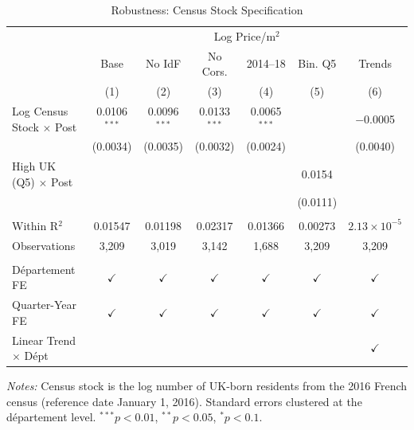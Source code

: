 
\begin{table}[htbp]
   \caption{\label{tab:robust} Robustness: Census Stock Specification}
   \bigskip
   \centering
   \begin{tabular}{lcccccc}
      \toprule
       & \multicolumn{6}{c}{Log Price/m$^2$}\\
                                             & Base           & No IdF         & No Cors.       & 2014--18       & Bin. Q5       & Trends \\
                                             & (1)            & (2)            & (3)            & (4)            & (5)           & (6)\\
      \midrule
      Log Census Stock $\times$ Post         & 0.0106$^{***}$ & 0.0096$^{***}$ & 0.0133$^{***}$ & 0.0065$^{***}$ &               & $-$0.0005\\
                                             & (0.0034)       & (0.0035)       & (0.0032)       & (0.0024)       &               & (0.0040)\\
      High UK (Q5) $\times$ Post             &                &                &                &                & 0.0154        &   \\
                                             &                &                &                &                & (0.0111)      &   \\
       \\
      Within R$^2$                           & 0.01547        & 0.01198        & 0.02317        & 0.01366        & 0.00273       & $2.13\times 10^{-5}$\\
      Observations                           & 3,209          & 3,019          & 3,142          & 1,688          & 3,209         & 3,209\\
       \\
      D\'{e}partement FE                     & $\checkmark$   & $\checkmark$   & $\checkmark$   & $\checkmark$   & $\checkmark$  & $\checkmark$\\
      Quarter-Year FE                        & $\checkmark$   & $\checkmark$   & $\checkmark$   & $\checkmark$   & $\checkmark$  & $\checkmark$\\
      Linear Trend $\times$ D\'{e}pt         &                &                &                &                &               & $\checkmark$\\
      \bottomrule
   \end{tabular}
   \par\vspace{0.5em}\noindent\footnotesize{\textit{Notes:} Census stock is the log number of UK-born residents from the 2016 French census (reference date January 1, 2016). Standard errors clustered at the d\'{e}partement level. $^{***}p<0.01$, $^{**}p<0.05$, $^{*}p<0.1$.}
\end{table}
